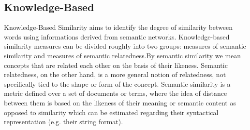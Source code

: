 \subsection{Knowledge-Based}
Knowledge-Based Similarity aims to identify the degree of similarity between words using informations derived from semantic networks.
Knowledge-based similarity measures can be divided roughly into two groups: measures of semantic similarity and measures of semantic relatedness.By semantic similarity we mean concepts that are related each other on the basis of their likeness.
Semantic relatedness, on the other hand, is a more general notion of relatedness, not specifically tied to the shape or form of the concept. Semantic similarity is a metric defined over a set of documents or terms, where the idea of distance between them is based on the likeness of their meaning or semantic content as opposed to similarity which can be estimated regarding their syntactical representation (e.g. their string format).
 
